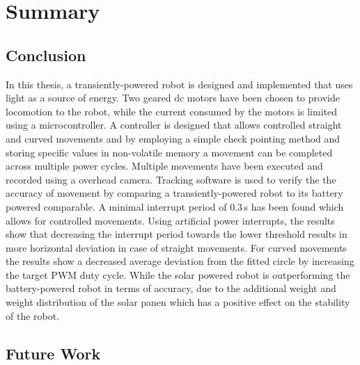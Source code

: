 \chapter{Summary}
\label{chp:summary}


\section{Conclusion}
\label{sec:conclusion}

In this thesis, a transiently-powered robot is designed and implemented that uses light as a source of energy.
Two geared dc motors have been chosen to provide locomotion to the robot, while the current consumed by the motors is limited using a microcontroller.
A controller is designed that allows controlled straight and curved movements and by employing a simple check pointing method and storing specific values in non-volatile memory a movement can be completed across multiple power cycles.
Multiple movements have been executed and recorded using a overhead camera.
Tracking software is used to verify the the accuracy of movement by comparing a transiently-powered robot to its battery powered comparable.
A minimal interrupt period of 0.3\,s has been found which allows for controlled movements.
Using artificial power interrupts, the results show that decreasing the interrupt period towards the lower threshold results in more horizontal deviation in case of straight movements.
For curved movements the results show a decreased average deviation from the fitted circle by increasing the target PWM duty cycle.
While the solar powered robot is outperforming the battery-powered robot in terms of accuracy, due to the additional weight and weight distribution of the solar panen which has a positive effect on the stability of the robot. 


\section{Future Work}
\label{sec:limitations_future_work}

